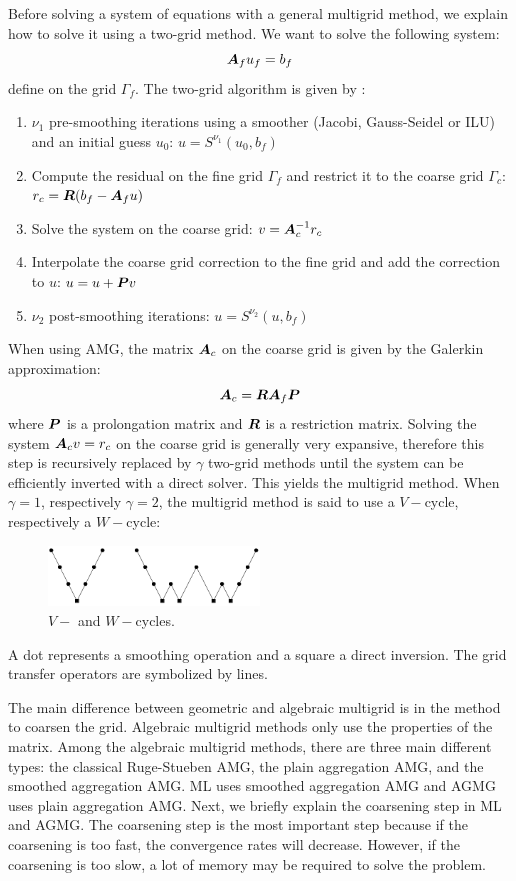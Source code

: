 Before solving a system of equations with a general multigrid method, we
explain how to solve it using a two-grid method. We want to
solve the following system:
\begin{equation}
  \boldsymbol{A}_f u_f = b_f
\end{equation}
define on the grid $\Gamma_f$. The two-grid algorithm is given by :
\begin{enumerate}
  \item $\nu_1$ pre-smoothing iterations using a smoother (Jacobi,
    Gauss-Seidel or ILU) and an initial guess $u_0$: $u = S^{\nu_1}(u_0,b_f)$
  \item Compute the residual on the fine grid $\Gamma_f$ and restrict it to
    the coarse grid $\Gamma_c$: $r_c = \boldsymbol{R}(b_f-\boldsymbol{A}_f u)$
  \item Solve the system on the coarse grid: $v=\boldsymbol{A}_c^{-1} r_c$
  \item Interpolate the coarse grid correction to the fine grid and add the
    correction to $u$: $u=u+\boldsymbol{P}v$
  \item $\nu_2$ post-smoothing iterations: $u = S^{\nu_2}(u,b_f)$
\end{enumerate}
When using AMG, the matrix $\boldsymbol{A}_c$ on the coarse grid is given by the
Galerkin approximation:
\begin{equation}
  \boldsymbol{A}_c = \boldsymbol{R} \boldsymbol{A}_f \boldsymbol{P}
\end{equation}
where $\boldsymbol{P}$ is a prolongation matrix and $\boldsymbol{R}$ is a restriction matrix. 
Solving the system $\boldsymbol{A}_c v = r_c$ on the coarse grid is generally very
expansive, therefore this step is recursively replaced by $\gamma$ two-grid
methods until the system can be efficiently inverted with a direct solver.
This yields the multigrid method. When $\gamma = 1$, respectively $\gamma =
2$, the multigrid method is said to use a $V-$cycle, respectively a $W-$cycle: 
\begin{figure}[H]
  \centering
  \includegraphics[width=0.5\textwidth]{v_w_cycles}
  \caption{$V-$ and $W-$cycles.}
\end{figure}
A dot represents a smoothing operation and a square a direct inversion. The
grid transfer operators are symbolized by lines.

The main difference between geometric and algebraic multigrid is in the method
to coarsen the grid. Algebraic multigrid methods only use the properties of the
matrix. Among the algebraic multigrid methods, there are three main different 
types: the classical Ruge-Stueben AMG, the plain aggregation AMG, and the
smoothed aggregation AMG. ML uses smoothed aggregation AMG and AGMG
uses plain aggregation AMG. Next, we briefly explain the coarsening step in
ML and AGMG. The coarsening step is the most important 
step because if the coarsening is too fast, the convergence rates will 
decrease. However, if the coarsening is too slow, a lot of memory may be 
required to solve the problem. 

